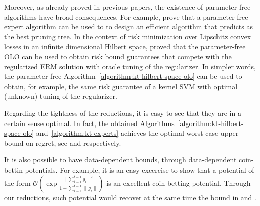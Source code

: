 Moreover, as already proved in previous papers, the existence of parameter-free
algorithms have broad consequences. For example, \citet{LuoS15} prove that a
parameter-free expert algorithm can be used to to design an efficient algorithm
that predicts as the best pruning tree. In the context of risk minimization over
Lipschitz convex losses in an infinite dimensional Hilbert space,
\citet{Orabona14} proved that the parameter-free \ac{OLO} can be used to obtain
risk bound guarantees that compete with the regularized \ac{ERM} solution with
oracle tuning of the regularizer. In simpler words, the parameter-free
Algorithm~\ref{algorithm:kt-hilbert-space-olo} can be used to obtain, for
example, the same risk guarantee of a kernel \ac{SVM} with optimal (unknown)
tuning of the regularizer.

Regarding the tightness of the reductions, it is easy to see that they are in a
certain sense optimal. In fact, the obtained
Algorithms~\ref{algorithm:kt-hilbert-space-olo} and~\ref{algorithm:kt-experts}
achieves the optimal worst case upper bound on regret, see \citet{Orabona13} and
\citet{Cesa-BianchiL06} respectively.

It is also possible to have data-dependent bounds, through data-dependent coin-bettin potentials.
For example, it is an easy excercise to show that a potential of the form $\mathcal{O}(\exp\frac{\|\sum_{i=1}^{t-1} g_{i}\|^2}{1+\sum_{i=1}^{t-1} \|g_{i}\|})$ is an excellent coin betting potential. Through our reductions, such potential would recover at the same time the bound in \citet{LuoS15} and \citet{Orabona14}.